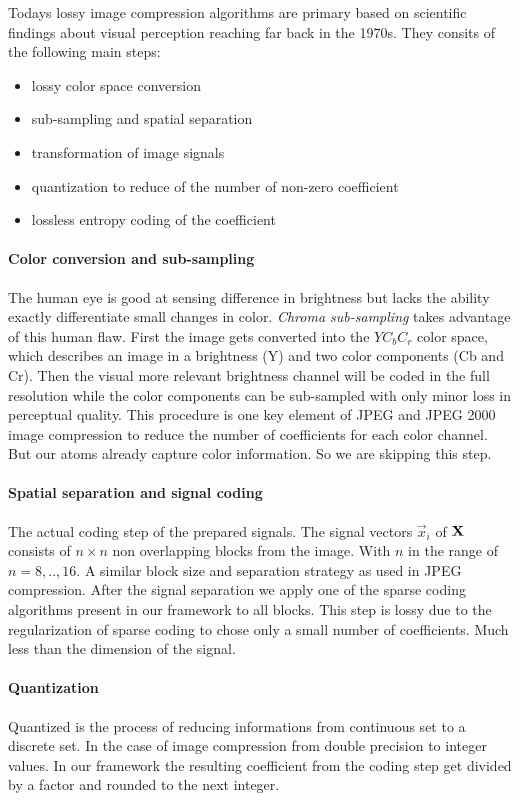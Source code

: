 Todays lossy image compression algorithms are primary based on scientific
findings about visual perception reaching far back in the 1970s.
They consits of the following main steps:
\begin{itemize}
 \item lossy color space conversion
 \item sub-sampling and spatial separation
 \item transformation of image signals
 \item quantization to reduce of the number of non-zero coefficient 
 \item lossless entropy coding of the coefficient 
\end{itemize}

\paragraph{Color conversion and sub-sampling} The human eye is good at sensing
difference in brightness but lacks the ability exactly differentiate small
changes in color. \emph{Chroma sub-sampling} takes advantage of this human flaw.
First the image gets converted into the $YC_bC_r$ color space, which describes
an image in a brightness (Y) and two color components (Cb and
Cr). Then the visual more relevant brightness channel will be coded in
the full resolution while the color components can be sub-sampled with
only minor loss in perceptual quality. This procedure is one key element of JPEG
and JPEG 2000 image compression to reduce the number of coefficients for each
color channel. But our atoms already capture color information. So we are
skipping this step. %

\paragraph{Spatial separation and signal coding}
The actual coding step of the prepared signals. The signal vectors $\vec{x}_i$
of $\boldsymbol{\mathrm{X}}$ consists of $n \times n$ non overlapping blocks from the image.
With $n$ in the range of $n=8,..,16$. A similar block size and separation
strategy as used in JPEG compression. After the signal separation we apply one
of the sparse coding algorithms present in our framework to all blocks. This
step is lossy due to the regularization of sparse coding to chose only a small
number  of coefficients. Much less than the dimension of the signal. 

\paragraph{Quantization}
Quantized is the process of reducing informations from continuous set to a
discrete set. In the case of image compression from double precision to integer
values. In our framework the resulting coefficient from the coding step get
divided by a factor and rounded to the next integer.  

